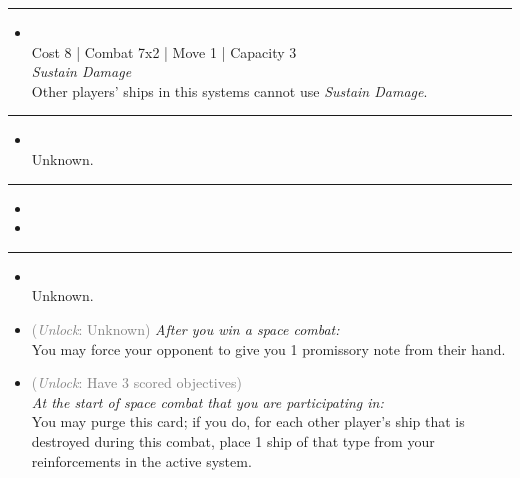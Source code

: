 \begin{multicols}{2}
\vspace{-10pt}\rule{\hsize}{0.4pt}\vspace{5pt}


\begin{itemize}
\item {}\\
Cost 8 | Combat 7x2 | Move 1 | Capacity 3 \\
\emph{Sustain Damage}\\
Other players' ships in this systems cannot use \emph{Sustain Damage}.
\end{itemize}

\vspace{-10pt}\rule{\hsize}{0.4pt}\vspace{5pt}


\begin{itemize}
\item {} %
\\
Unknown.
\end{itemize}

\vspace{-10pt}\rule{\hsize}{0.4pt}\vspace{5pt}

\nounits

\columnbreak
{}

\begin{itemize}
\item \salvageOperations
\item \mirrorComputing
\end{itemize}

\vspace{-10pt}\rule{\hsize}{0.4pt}\vspace{5pt}


\begin{itemize}
\item {}\\
Unknown.
\item {} \textcolor{gray}{(\emph{Unlock}: Unknown)} %
\emph{After you win a space combat:}\\
You may force your opponent to give you 1 promissory note from their hand.
\item {} \textcolor{gray}{(\emph{Unlock}: Have 3 scored objectives)}\\
\emph{At the start of space combat that you are participating in:}\\
You may purge this card; if you do, for each other player’s ship that is destroyed during this combat, place 1 ship of that type from your reinforcements in the active system.
\end{itemize}


\end{multicols}
